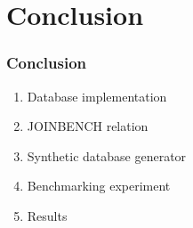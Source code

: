 \documentclass{beamer}
\begin{document}
\section{Conclusion}
\begin{frame}
\frametitle{Conclusion}
\begin{enumerate}
    \item Database implementation
    \item JOINBENCH relation
    \item Synthetic database generator
    \item Benchmarking experiment
    \item Results
\end{enumerate}
\end{frame}
\end{document}
